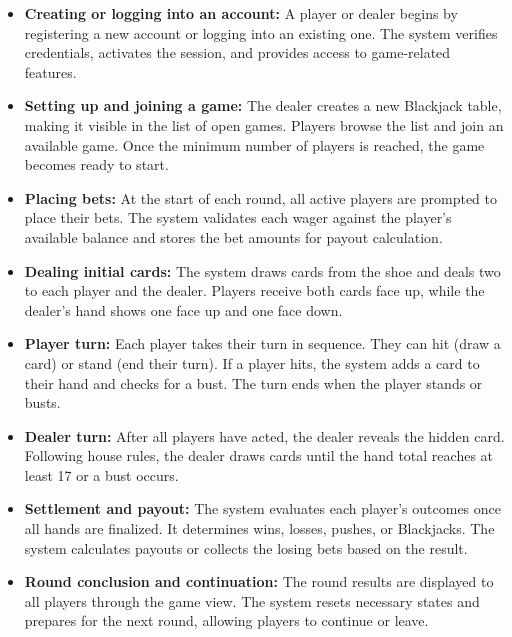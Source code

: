 \begin{itemize}
\item
\textbf{Creating or logging into an account:} A player or dealer begins by registering a new account or logging into an existing one. The system verifies credentials, activates the session, and provides access to game-related features.
\item
\textbf{Setting up and joining a game:} The dealer creates a new Blackjack table, making it visible in the list of open games. Players browse the list and join an available game. Once the minimum number of players is reached, the game becomes ready to start.
\item
\textbf{Placing bets:} At the start of each round, all active players are prompted to place their bets. The system validates each wager against the player's available balance and stores the bet amounts for payout calculation.
\item
\textbf{Dealing initial cards:} The system draws cards from the shoe and deals two to each player and the dealer. Players receive both cards face up, while the dealer's hand shows one face up and one face down.
\item
\textbf{Player turn:} Each player takes their turn in sequence. They can hit (draw a card) or stand (end their turn). If a player hits, the system adds a card to their hand and checks for a bust. The turn ends when the player stands or busts.
\item
\textbf{Dealer turn:} After all players have acted, the dealer reveals the hidden card. Following house rules, the dealer draws cards until the hand total reaches at least 17 or a bust occurs.
\item
\textbf{Settlement and payout:} The system evaluates each player's outcomes once all hands are finalized. It determines wins, losses, pushes, or Blackjacks. The system calculates payouts or collects the losing bets based on the result.
\item
\textbf{Round conclusion and continuation:} The round results are displayed to all players through the game view. The system resets necessary states and prepares for the next round, allowing players to continue or leave.
\end{itemize}

